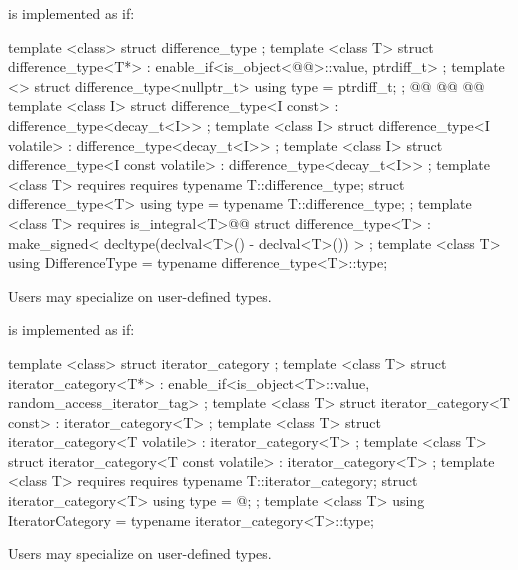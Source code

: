 \begin{addedblock}
\pnum
{}%
 is implemented as if:

%
\begin{codeblock}
  template <class> struct difference_type { };
  template <class T>
  struct difference_type<T*>
    : enable_if<is_object<@@>::value, ptrdiff_t> { };
  template <>
  struct difference_type<nullptr_t> {
    using type = ptrdiff_t;
  };
  @@
    @@
  @@
  template <class I>
  struct difference_type<I const> : difference_type<decay_t<I>> { };
  template <class I>
  struct difference_type<I volatile> : difference_type<decay_t<I>> { };
  template <class I>
  struct difference_type<I const volatile> : difference_type<decay_t<I>> { };
  template <class T>
    requires requires { typename T::difference_type; }
  struct difference_type<T> {
    using type = typename T::difference_type;
  };
  template <class T>
    requires is_integral<T>@\oldtxt{()}@
  struct difference_type<T>
    : make_signed< decltype(declval<T>() - declval<T>()) > {
  };
  template <class T>
    using DifferenceType = typename difference_type<T>::type;
\end{codeblock}


\pnum
Users may specialize  on user-defined types.

\pnum
{}%
 is implemented as if:

%
\begin{codeblock}
  template <class> struct iterator_category { };
  template <class T>
  struct iterator_category<T*>
    : enable_if<is_object<T>::value, random_access_iterator_tag> { };
  template <class T>
  struct iterator_category<T const> : iterator_category<T> { };
  template <class T>
  struct iterator_category<T volatile> : iterator_category<T> { };
  template <class T>
  struct iterator_category<T const volatile> : iterator_category<T> { };
  template <class T>
    requires requires { typename T::iterator_category; }
  struct iterator_category<T> {
    using type = @\seebelow@;
  };
  template <class T>
    using IteratorCategory = typename iterator_category<T>::type;
\end{codeblock}

\pnum
Users may specialize  on user-defined types.
\end{addedblock}

